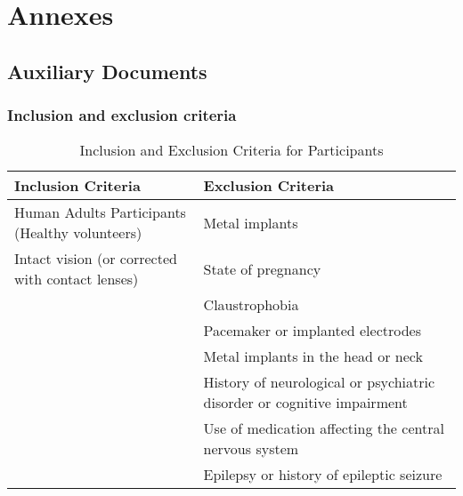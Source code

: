 
\chapter{Annexes}
\label{chapter:appendixDatasheets}




\section{Auxiliary Documents}

\subsection{Inclusion and exclusion criteria}

\begin{table}[H]
	\centering
	\caption{Inclusion and Exclusion Criteria for Participants}
	\label{tab:criteria}
	\begin{tabular}{|p{7cm}|p{7cm}|}
		\hline
		\textbf{Inclusion Criteria} & \textbf{Exclusion Criteria} \\ \hline
		Human Adults Participants (Healthy volunteers) & Metal implants \\ \hline
		Intact vision (or corrected with contact lenses) & State of pregnancy \\ \hline
		& Claustrophobia \\ \hline
		& Pacemaker or implanted electrodes \\ \hline
		& Metal implants in the head or neck \\ \hline
		& History of neurological or psychiatric disorder or cognitive impairment \\ \hline
		& Use of medication affecting the central nervous system \\ \hline
		& Epilepsy or history of epileptic seizure \\ \hline
	\end{tabular}
\end{table}




%